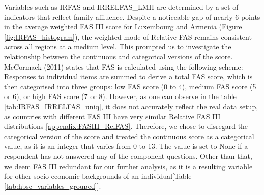 \documentclass[main.tex]{subfiles}
\begin{document}
 
Variables such as IRFAS and IRRELFAS\_LMH are determined by a set of indicators that reflect family affluence. Despite a noticeable gap of nearly 6 points in the average weighted FAS III score for Luxembourg and Armenia (Figure \ref{fig:IRFAS_histogram}), the weighted mode of Relative FAS remains consistent across all regions at a medium level. This prompted us to investigate the relationship between the continuous and categorical versions of the score. McCormack (2011) states that FAS is calculated using the following scheme: Responses to individual items are summed to derive a total FAS score, which is then categorised into three groups: low FAS score (0 to 4), medium FAS score (5 or 6), or high FAS score (7 or 8). However, as one can observe in the table  \ref{tab:IRFAS_IRRELFAS_uniq}, it does not accurately reflect the real data setup, as countries with different FAS III have very similar Relative FAS III distributions \ref{appendix:FASIII_RelFAS}. Therefore, we chose to disregard the categorical version of the score and treated the continuous score as a categorical value, as it is an integer that varies from 0 to 13. The value is set to None if a respondent has not answered any of the component questions. Other than that, we deem FAS III redundant for our further analysis, as it is a resulting variable for other socio-economic backgrounds of an individual[Table \ref{tab:hbsc_variables_grouped}].
\end{document}
